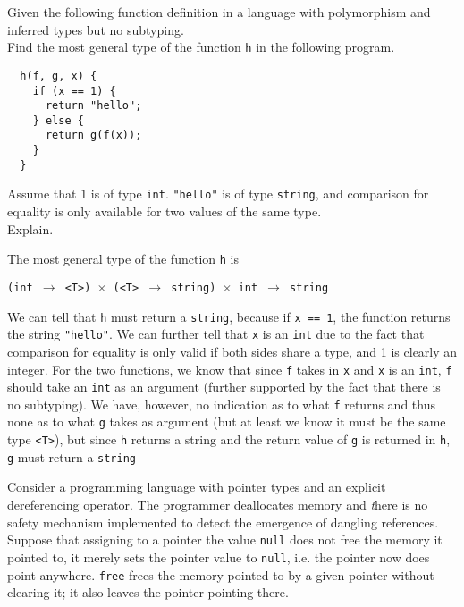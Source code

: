\documentclass[11pt]{exam}
\begin{document}
\begin{questions}
      \question Given the following function definition in a language
        with polymorphism and inferred types but no subtyping.\\
        Find the most general type of the function {\tt h} in the following program.
\begin{lstlisting}
  h(f, g, x) {
    if (x == 1) {
      return "hello";
    } else {
      return g(f(x));
    }
  }
\end{lstlisting}
        Assume that $1$ is of type {\tt int}. {\tt "hello"} is of type {\tt string},
        and comparison for equality is only available for two values of the same type. \\
        Explain.

	\begin{framed}

            The most general type of the function {\tt h} is 
            
            {\tt (int $\to$ <T>) $\times$ (<T> $\to$ string) $\times$ int $\to$ string}

            We can tell that {\tt h} must return a {\tt string}, because if {\tt x == 1}, the function returns the string {\tt "hello"}. We can further tell that {\tt x} is an {\tt int} due to the fact that comparison for equality is only valid if both sides share a type, and 1 is clearly an integer. For the two functions, we know that since {\tt f} takes in {\tt x} and {\tt x} is an {\tt int}, {\tt f} should take an {\tt int} as an argument (further supported by the fact that there is no subtyping). We have, however, no indication as to what {\tt f} returns and thus none as to what {\tt g} takes as argument (but at least we know it must be the same type {\tt <T>}), but since {\tt h} returns a string and the return value of {\tt g} is returned in {\tt h}, {\tt g} must return a {\tt string}

	\end{framed}


	\question Consider a programming language with pointer types and an explicit dereferencing operator. The programmer deallocates memory and {\emph there is no safety mechanism implemented to detect the emergence of dangling references}. Suppose that assigning to a pointer the value {\tt null} does not free the memory it pointed to, it merely sets the pointer value to {\tt null}, i.e. the pointer now does point anywhere. {\tt free} frees the memory pointed to by a given pointer without clearing it; it also leaves the pointer pointing there.


\end{questions}
\end{document}

